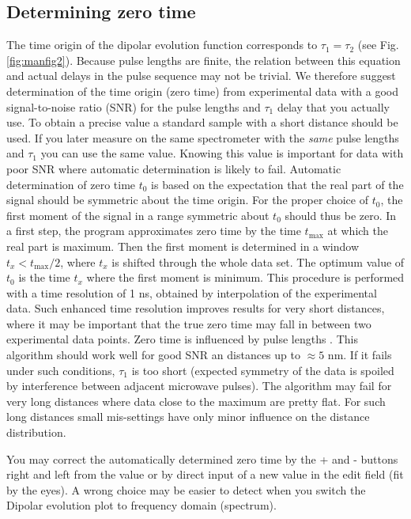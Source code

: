 \documentclass{article}
\begin{document}
\subsection{Determining zero time}
The time origin of the dipolar evolution function corresponds to $\tau_1 = \tau_2$ (see
Fig. \ref{fig:manfig2}). Because pulse lengths are finite, the relation between this equation and actual delays in the pulse sequence may not be trivial. We therefore suggest
determination of the time origin (zero time) from experimental data with a good
signal-to-noise ratio (SNR) for the pulse lengths and $\tau_1$ delay that you actually
use. To obtain a precise value a standard sample with a short distance should be used. If you later measure on the same spectrometer with the \emph{same} pulse lengths
and $\tau_1$ you can use the same value. Knowing this value is important for data
with poor SNR where automatic determination is likely to fail.
Automatic determination of zero time $t_0$ is based on the expectation that
the real part of the signal should be symmetric about the time origin. For the
proper choice of $t_0$, the first moment of the signal in a range symmetric about
$t_0$ should thus be zero. In a first step, the program approximates zero time by
the time $t_{\mathrm{max}}$ at which the real part is maximum. Then the first moment is
determined in a window $t_x<t_{\mathrm{max}}/2$, where $t_x$ is shifted through the whole data
set. The optimum value of $t_0$ is the time $t_x$ where the first moment is minimum. This procedure is performed with a time resolution of 1 ns, obtained by interpolation of the experimental data. Such enhanced time resolution improves results for very short distances, where it may be important that the true zero time may fall in between two experimental data points. Zero time is influenced by pulse lengths \cite{maryasov2000,milov2004}. This
algorithm should work well for good SNR an distances up to $\approx5$ nm. If it fails
under such conditions, $\tau_1$ is too short (expected symmetry of the data is spoiled
by interference between adjacent microwave pulses). The algorithm may fail
for very long distances where data close to the maximum are pretty flat. For
such long distances small mis-settings have only minor influence on the distance
distribution.

You may correct the automatically determined zero time by the {\ttfamily +} and {\ttfamily -}
buttons right and left from the value or by direct input of a new value in the edit field
(fit by the eyes). A wrong choice may be easier to detect when you switch
the {\ttfamily Dipolar evolution} plot to frequency domain ({\ttfamily spectrum}).
\end{document}
